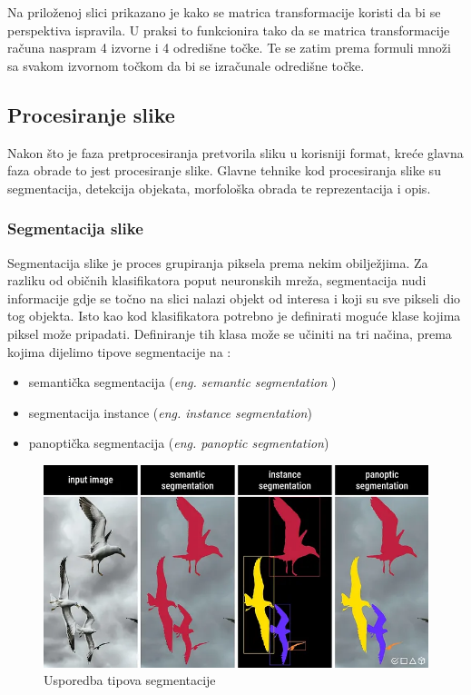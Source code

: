 \documentclass{foi}
\begin{document}
Na priloženoj slici prikazano je kako se matrica transformacije koristi da bi se perspektiva ispravila. U praksi to funkcionira tako da se matrica transformacije računa naspram 4 izvorne i 4 odredišne točke. Te se zatim prema formuli množi sa svakom izvornom točkom da bi se izračunale odredišne točke.

\subsection{Procesiranje slike}

Nakon što je faza pretprocesiranja pretvorila sliku u korisniji format, kreće glavna faza obrade to jest procesiranje slike. Glavne tehnike kod procesiranja slike su segmentacija, detekcija objekata, morfološka obrada te reprezentacija i opis.

\subsubsection{Segmentacija slike}

Segmentacija slike je proces grupiranja piksela prema nekim obilježjima. Za razliku od običnih klasifikatora poput neuronskih mreža, segmentacija nudi informacije gdje se točno na slici nalazi objekt od interesa i koji su sve pikseli dio tog objekta. Isto kao kod klasifikatora potrebno je definirati moguće klase kojima piksel može pripadati. Definiranje tih klasa može se učiniti na tri načina, prema kojima dijelimo tipove segmentacije na \cite{segmentacija}:

\begin{itemize}
    \item semantička segmentacija (\textit{eng. semantic segmentation })
    \item segmentacija instance (\textit{eng. instance segmentation})
    \item panoptička segmentacija (\textit{eng. panoptic segmentation})
\end{itemize}

\begin{figure}[H]
    \centering
    \includegraphics[width=0.85\linewidth]{slike/sesgmentacija.png}
    \caption{Usporedba tipova segmentacije \cite{segmentacija}}
\end{figure}
\end{document}
